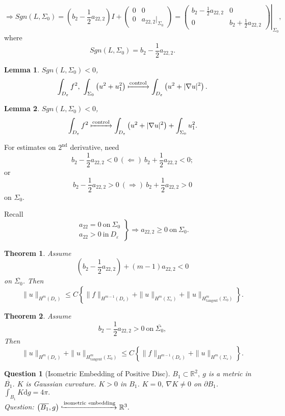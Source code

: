 \documentclass[12pt]{article}
\newtheorem{lemma}{Lemma}
\newtheorem{question}{Question}
\newtheorem{theorem}{Theorem}
\begin{document}
\[
\Rightarrow Sgn(L,\Sigma_0) = \left(b_2-\frac{1}{2}a_{22,2} \right)I+
\left(\begin{array}{cc}
0&0\\
0&a_{22,2}|_{\Sigma_0}
\end{array}\right)=\left.
\left(\begin{array}{cc} 
b_2-\frac{1}{2}a_{22,2}&0\\
0&b_2+\frac{1}{2}a_{22,2}
\end{array} \right)\right|_{\Sigma_0},
\]
where
\[Sgn(L,\Sigma_0)=b_2-\frac{1}{2}a_{22,2}. \]
\begin{lemma}
$Sgn(L,\Sigma_0)<0$,
\[\int_{D_\varepsilon}f^2,\ \int_{\Sigma_0}\left(u^2+u_1^2\right)\xmapsto[]{{\mathrm{control}}}\int_{D_\varepsilon}\left(u^2+|\nabla u|^2\right) .\]
\end{lemma}
\begin{lemma}
$Sgn(L,\Sigma_0)<0$,
\[\int_{D_\varepsilon}f^2\xmapsto[]{{\mathrm{control}}}\int_{D_\varepsilon}\left(u^2+|\nabla u|^2\right)+\int_{\Sigma_0}u_1^2. \]
\end{lemma}
For estimates on $2^{\mathrm{nd}}$ derivative, need
\[b_2-\frac{1}{2}a_{22,2}<0\ (\Leftarrow)\ b_2+\frac{1}{2}a_{22,2}<0; \]
or
\[b_2-\frac{1}{2}a_{22,2}>0\ (\Rightarrow)\ b_2+\frac{1}{2}a_{22,2}>0 \]
on $\Sigma_0$.

Recall
\[
\left.\begin{array}{c}
a_{22}=0\ \mathrm{on\ }\Sigma_0\\
a_{22}>0\ \mathrm{in\ }D_\varepsilon
\end{array}\right\}\Rightarrow a_{22,2}\ge0\ \mathrm{on\ }\Sigma_0.
\]

\begin{theorem}
Assume 
\[\left(b_2-\frac{1}{2}a_{22,2}\right)+(m-1)a_{22,2}<0\] 
on $\overline{\Sigma_0}$.
Then
\[\|u\|_{H^m(D_\varepsilon)}\le C\left\{\|f\|_{H^{m-1}(D_\varepsilon)}+\|u\|_{H^m(\Sigma_\varepsilon)}+\|u\|_{H^m_{{\mathrm{tangent}}}(\Sigma_0)} \right\}. \]
\end{theorem}
\begin{theorem}
Assume
\[b_2-\frac{1}{2}a_{22,2}>0\mathrm{\ on\ }\overline{\Sigma_0}, \]
Then
\[\|u\|_{H^m(D_\varepsilon)}+\|u\|_{H^m_{{\mathrm{tangent}}}(\Sigma_0)}\le C\left\{\|f\|_{H^{m-1}(D_\varepsilon)}+\|u\|_{H^m(\Sigma_\varepsilon)} \right\}.  \]
\end{theorem}

\begin{question}[Isometric Embedding of Positive Disc]
$B_1\subset \mathbb{R}^2,\ g $ is a metric in $\overline{B_1}$.
$K$ is Gaussian curvature. $K>0 $ in $B_1$. $K=0,\ \nabla K\ne 0$ on $\partial B_1$. $\int_{B_1}K\mathrm{d}g=4\pi. $\\
Question: $\left(\overline{B_1}, g\right)\xhookrightarrow[]{\mathrm{isometric\ embedding}} \mathbb{R}^3. $
\end{question}
\end{document}
